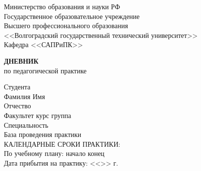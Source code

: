 \documentclass[a4paper, 14pt]{extreport}
\begin{document}
    \begin{titlepage}
        \begin{center}
            Министерство образования и науки РФ \\
            Государственное образовательное учреждение\\
            Высшего профессионального образования\\
            <<Волгоградский государственный технический университет>>\\
            Кафедра <<САПРиПК>>
        \end{center}
        \vspace{2cm}
        \begin{center}
            \large \textbf{ДНЕВНИК} \\
            по педагогической практике
        \end{center}
        \begin{flushleft}
            Студента\\
            Фамилия \underline{\hspace{5cm}} 
            Имя \underline{\hspace{5.1cm}}\\
            Отчество \underline{\hspace{5cm}}\\
            Факультет \underline{\hspace{4.8cm}} курс \underline{\hspace{2cm}} 
            группа \underline{\hspace{4cm}}\\
            \vspace{1cm}
            Специальность \underline{\hspace{12.8cm}}\\
            База проведения практики \underline{\hspace{10.4cm}}\\
            \vspace{1cm}
            КАЛЕНДАРНЫЕ СРОКИ ПРАКТИКИ:\\
            По учебному плану: \hspace{0.5cm} начало \underline{\hspace{4cm}} 
            конец \underline{\hspace{4cm}}\\
            Дата прибытия на практику: <<\underline{\hspace{1cm}}>> \underline{\hspace{3cm}} \the\year г.\\

\end{flushleft}
\end{titlepage}
\end{document}

